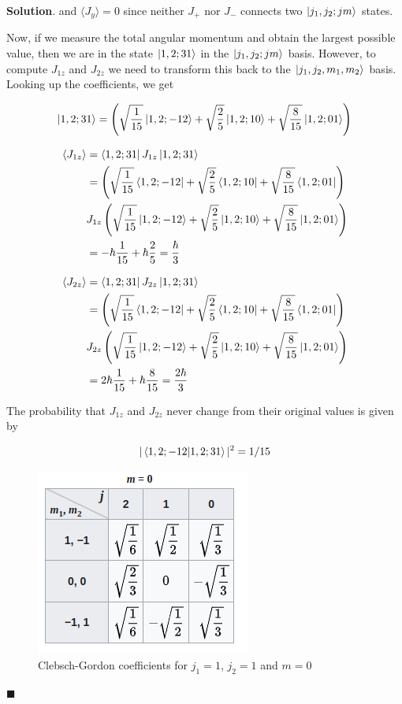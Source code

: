 \documentclass[12pt]{article}
\theoremstyle{definition}
\newenvironment{s}{%
        \begin{trivlist} \item \textbf{Solution}. }{%
            \hspace*{\fill} $\blacksquare$\end{trivlist}}%
\begin{document}
{\begin{s}
and $\langle J_{y} \rangle = 0$ since neither $J_+$ nor $J_-$ connects two $\ket{j_1,j_2;jm}$ states.

Now, if we measure the total angular momentum and obtain the largest possible value, then we are in the state $\ket{1,2;31}$ in the $\ket{j_1,j_2;jm}$ basis. However, to compute $J_{1z}$ and $J_{2z}$ we need to transform this back to the $\ket{j_1, j_2, m_1, m_2}$ basis. Looking up the coefficients, we get

\begin{align*}
\ket{1,2;31} = \left(\sqrt{\frac{1}{15}}\ket{1,2;-12} + \sqrt{\frac{2}{5}}\ket{1,2;10} + \sqrt{\frac{8}{15}}\ket{1,2;01}\right)
\end{align*}

\begin{align*}
\langle J_{1z} \rangle &= \bra{1,2;31} J_{1z}  \ket{1,2;31} \\
&= \left(\sqrt{\frac{1}{15}}\bra{1,2;-12} + \sqrt{\frac{2}{5}}\bra{1,2;10} + \sqrt{\frac{8}{15}}\bra{1,2;01}\right)\\
&J_{1z}\left(\sqrt{\frac{1}{15}}\ket{1,2;-12} + \sqrt{\frac{2}{5}}\ket{1,2;10} + \sqrt{\frac{8}{15}}\ket{1,2;01}\right)\\
&= -\hbar\frac{1}{15} + \hbar\frac{2}{5} =  \frac{\hbar}{3}
\end{align*}

\begin{align*}
\langle J_{2z} \rangle &= \bra{1,2;31} J_{2z}  \ket{1,2;31} \\
&= \left(\sqrt{\frac{1}{15}}\bra{1,2;-12} + \sqrt{\frac{2}{5}}\bra{1,2;10} + \sqrt{\frac{8}{15}}\bra{1,2;01}\right)\\
&J_{2z}\left(\sqrt{\frac{1}{15}}\ket{1,2;-12} + \sqrt{\frac{2}{5}}\ket{1,2;10} + \sqrt{\frac{8}{15}}\ket{1,2;01}\right)\\
&= 2\hbar\frac{1}{15} + \hbar\frac{8}{15} = \frac{2\hbar}{3}
\end{align*}

The probability that $J_{1z}$ and $J_{2z}$ never change from their original values is given by 

\begin{align*}
|\bra{1,2;-12}\ket{1,2;31}|^{2} = 1/15
\end{align*}

\begin{figure}
\centering
\includegraphics[scale=0.75]{cb-table-2.png}
\caption{Clebsch-Gordon coefficients for $j_{1} = 1$, $j_{2} = 1$ and $m=0$}
\end{figure}


\end{s}}
\end{document}
